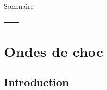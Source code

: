 %


\begin{frame}{Sommaire}

\small
  
\hspace*{2mm}
\begin{tabular}{cc}
  		\begin{minipage}{62mm}
  			\tableofcontents[firstsection=-10]
      \vspace{15mm}
  		\end{minipage}
  		&   
  		\begin{minipage}{60cm}
		  \vspace*{-5mm}  
  		\end{minipage}
  	\end{tabular}

\vspace{0mm}

\end{frame}

\section{\bfseries Ondes de choc}

\subsection{Introduction}

